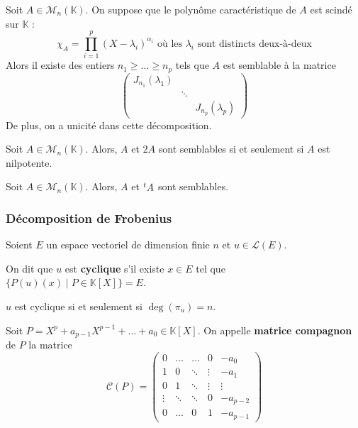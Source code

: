   \begin{theorem}
    Soit $A \in \mathcal{M}_n(\mathbb{K})$. On suppose que le polynôme caractéristique de $A$ est scindé sur $\mathbb{K}$ :
    \[ \chi_A = \prod_{i=1}^p (X - \lambda_i)^{\alpha_i} \text{ où les } \lambda_i \text{ sont distincts deux-à-deux} \]
    Alors il existe des entiers $n_1 \geq \dots \geq n_p$ tels que $A$ est semblable à la matrice
    \[ \begin{pmatrix} J_{n_1}(\lambda_1) & & \\ & \ddots & \\ & & J_{n_p}(\lambda_p) \end{pmatrix} \]
    De plus, on a unicité dans cette décomposition.
  \end{theorem}

  \begin{application}
    Soit $A \in \mathcal{M}_n(\mathbb{K})$. Alors, $A$ et $2A$ sont semblables si et seulement si $A$ est nilpotente.
  \end{application}

  \begin{application}
    Soit $A \in \mathcal{M}_n(\mathbb{K})$. Alors, $A$ et $\mathstrut ^t A$ sont semblables.
  \end{application}

  \subsubsection{Décomposition de Frobenius}


  Soient $E$ un espace vectoriel de dimension finie $n$ et $u \in \mathcal{L}(E)$.

  \begin{definition}
    \label{154-1}
    On dit que $u$ est \textbf{cyclique} s'il existe $x \in E$ tel que $\{ P(u)(x) \mid P \in \mathbb{K}[X] \} = E$.
  \end{definition}

  \begin{proposition}
    $u$ est cyclique si et seulement si $\deg(\pi_u) = n$.
  \end{proposition}

  \begin{definition}
    Soit $P = X^p + a_{p-1} X^{p-1} + \dots + a_0 \in \mathbb{K}[X]$. On appelle \textbf{matrice compagnon} de $P$ la matrice
    \[ \mathcal{C}(P) = \begin{pmatrix} 0 & \dots & \dots & 0 & -a_0 \\ 1 & 0 & \ddots & \vdots & -a_1 \\ 0 & 1 & \ddots & \vdots & \vdots \\ \vdots & \ddots & \ddots & 0 & -a_{p-2} \\ 0 & \dots & 0 & 1 & -a_{p-1} \end{pmatrix} \]
  \end{definition}

